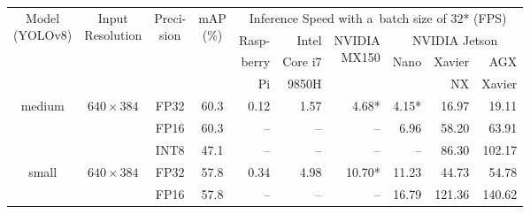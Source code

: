 \begin{appendices}
\begin{table}
    \footnotesize
    \centering
    \begin{threeparttable}
        \begin{tabular}{|c|c|c|c|rrrrrr|}
            \hline
            \multirow{4}{*}{\parbox{1.6cm}{\centering Model\\(YOLOv8)}} &
            \multirow{4}{*}{\parbox{1.5cm}{\centering Input\\Resolution}} &
                \multirow{4}{*}{\parbox{0.9cm}{\centering Preci-\\sion}} &
                \multirow{4}{*}{\parbox{0.8cm}{\centering mAP\\(\%)}} &
                    \multicolumn{6}{c|}{Inference Speed with a~batch size of 32* (FPS)} \\
            \cline{5-10}
            & & & & Rasp- & Intel   &\multirow{3}{*}{\parbox{1.2cm}{\raggedleft NVIDIA\\MX150}} & \multicolumn{3}{|c|}{NVIDIA Jetson} \\
            \cline{8-10}
            & & & & berry & Core i7 &                                                           & \multicolumn{1}{|c}{\multirow{2}{*}{Nano}} & Xavier & AGX \\
            & & & & Pi    & 9850H   &                                                           & \multicolumn{1}{|c}{}                      & NX     & Xavier \\
            \hline
            \hline
            \multirow{3}{*}{medium}                                   & \multirow{3}{*}{$640 \times 384$} & FP32 & 60.3 &  0.12 &   1.57 &  4.68* &  4.15* &   16.97 &   19.11 \\
                                                                    &                                   & FP16 & 60.3 &    -- &     -- &     -- &   6.96 &   58.20 &   63.91 \\
                                                                    &                                   & INT8 & 47.1 &    -- &     -- &     -- &     -- &   86.30 &  102.17 \\
            \hline
            \multirow{3}{*}{small}                                    & \multirow{3}{*}{$640 \times 384$} & FP32 & 57.8 &  0.34 &   4.98 & 10.70* &  11.23 &   44.73 &   54.78 \\
                                                                    &                                   & FP16 & 57.8 &    -- &     -- &     -- &  16.79 &  121.36 &  140.62 \\

\end{tabular}
\end{threeparttable}
\end{table}
\end{appendices}
